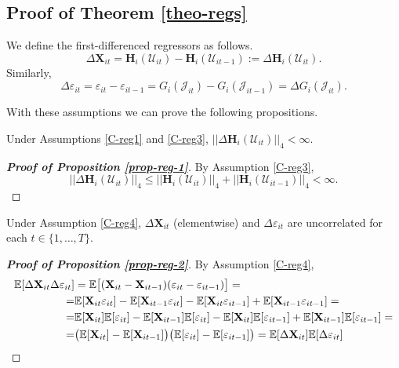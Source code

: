 \documentclass[a4paper,12pt]{article}
\begin{document}
\subsection{Proof of Theorem \ref{theo-regs}}\label{subsec-appendix-estimators}

We define the first-differenced regressors as follows.
\[ \Delta \mathbf{X}_{it} =\mathbf{H}_i(\mathcal{U}_{it}) - \mathbf{H}_i(\mathcal{U}_{it-1}) := \Delta \mathbf{H}_i(\mathcal{U}_{it}). \]
Similarly, 
\[\Delta \varepsilon_{it} = \varepsilon_{it} - \varepsilon_{it-1} = G_i(\mathcal{J}_{it}) - G_i(\mathcal{J}_{it-1}) = \Delta G_i(\mathcal{J}_{it}).
\]
 
With these assumptions we can prove the following propositions.
\begin{prop}\label{prop-reg-1}
Under Assumptions \ref{C-reg1} and \ref{C-reg3}, $|| \Delta \mathbf{H}_i(\mathcal{U}_{it})||_4 < \infty$.
\end{prop}

\begin{proof}[\textnormal{\textbf{Proof of Proposition \ref{prop-reg-1}}}]
By Assumption \ref{C-reg3},
\[
 || \Delta \mathbf{H}_i(\mathcal{U}_{it})||_4 \leq  ||\mathbf{H}_i(\mathcal{U}_{it})||_4 +  || \mathbf{H}_i(\mathcal{U}_{it-1})||_4 < \infty.
\]
\end{proof} 

\begin{prop}\label{prop-reg-2}
Under Assumption \ref{C-reg4}, $\Delta \mathbf{X}_{it}$ (elementwise) and $\Delta \varepsilon_{it}$ are uncorrelated for each $t\in \{1, \ldots, T\}$.
\end{prop}

\begin{proof}[\textnormal{\textbf{Proof of Proposition \ref{prop-reg-2}}}]
By Assumption \ref{C-reg4},
\begin{align*}
\mathbb{E} [\Delta \mathbf{X}_{it}\Delta \varepsilon_{it}] &= \mathbb{E} \big[(\mathbf{X}_{it} - \mathbf{X}_{it-1}) (\varepsilon_{it} - \varepsilon_{it-1})\big] =\\
=&\mathbb{E}[\mathbf{X}_{it}  \varepsilon_{it}] - \mathbb{E}[\mathbf{X}_{it-1}  \varepsilon_{it}]- \mathbb{E}[\mathbf{X}_{it}  \varepsilon_{it-1}] + \mathbb{E}[\mathbf{X}_{it-1}  \varepsilon_{it-1}] =\\
=& \mathbb{E}[\mathbf{X}_{it}]\mathbb{E}[  \varepsilon_{it}] - \mathbb{E}[\mathbf{X}_{it-1}]\mathbb{E}[  \varepsilon_{it}]- \mathbb{E}[\mathbf{X}_{it}]\mathbb{E}[  \varepsilon_{it-1}] + \mathbb{E}[\mathbf{X}_{it-1}]\mathbb{E}[  \varepsilon_{it-1}] =\\
=& \big( \mathbb{E}[\mathbf{X}_{it}] - \mathbb{E}[\mathbf{X}_{it-1}]\big)\big(\mathbb{E}[  \varepsilon_{it}]  - \mathbb{E}[\varepsilon_{it-1}]\big) = \mathbb{E} [\Delta \mathbf{X}_{it}]\mathbb{E}[\Delta \varepsilon_{it}]
\end{align*}
\end{proof} 
\end{document}
